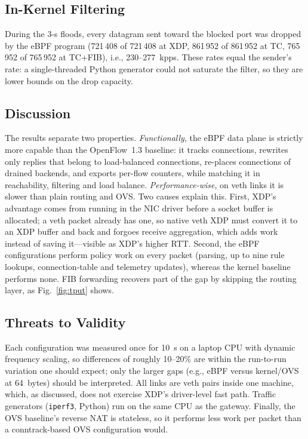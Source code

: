 \documentclass[conference]{IEEEtran}
\begin{document}
\subsection{In-Kernel Filtering}
During the 3-s floods, every datagram sent toward the blocked port was dropped
by the eBPF program (721\,408 of 721\,408 at XDP, 861\,952 of 861\,952 at TC,
765\,952 of 765\,952 at TC+FIB), i.e., 230--277~kpps. These rates equal the
sender's rate: a single-threaded Python generator could not saturate the
filter, so they are lower bounds on the drop capacity.

\subsection{Discussion}
The results separate two properties. \emph{Functionally}, the eBPF data
plane is strictly more capable than the OpenFlow~1.3 baseline: it tracks
connections, rewrites only replies that belong to load-balanced connections,
re-places connections of drained backends, and exports per-flow counters,
while matching it in reachability, filtering and load balance.
\emph{Performance-wise}, on veth links it is slower than plain routing and
OVS. Two causes explain this. First, XDP's advantage comes from running in the
NIC driver before a socket buffer is allocated; a veth packet already has one,
so native veth XDP must convert it to an XDP buffer and back and forgoes
receive aggregation, which adds work instead of saving it---visible as XDP's
higher RTT. Second, the eBPF configurations perform policy work on every
packet (parsing, up to nine rule lookups, connection-table and telemetry
updates), whereas the kernel baseline performs none. FIB forwarding recovers
part of the gap by skipping the routing layer, as Fig.~\ref{fig:tput} shows.

\subsection{Threats to Validity}
\label{sec:threats}
Each configuration was measured once for 10~s on a laptop CPU with dynamic
frequency scaling, so differences of roughly 10--20\% are within the
run-to-run variation one should expect; only the larger gaps (e.g., eBPF
versus kernel/OVS at 64~bytes) should be interpreted. All links are veth
pairs inside one machine, which, as discussed, does not exercise XDP's
driver-level fast path. Traffic generators (\texttt{iperf3}, Python) run on the
same CPU as the gateway. Finally, the OVS baseline's reverse NAT is stateless,
so it performs less work per packet than a conntrack-based OVS configuration
would.
\end{document}
